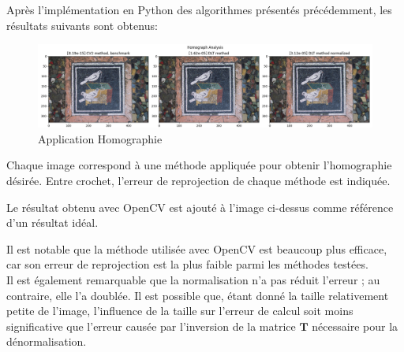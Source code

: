 \documentclass[../CSC_5RO17_TA_TP1.tex]{subfiles}
\begin{document}
\noindent Après l'implémentation en Python des algorithmes présentés précédemment, les résultats suivants sont obtenus:
\begin{figure}[H]
    \centering
    \includegraphics[width=\linewidth]{../../data/output/CSC_5RO17_TP1_Q3.png}
    \caption{Application Homographie}
    \label{fig_homography}
\end{figure}
Chaque image correspond à une méthode appliquée pour obtenir l'homographie désirée. Entre crochet, l'erreur de reprojection de chaque méthode est indiquée.
\begin{remark}
    Le résultat obtenu avec OpenCV est ajouté à l'image ci-dessus comme référence d'un résultat idéal.
    \begin{scriptsize}\mycode
        
    \end{scriptsize}
\end{remark}
\noindent Il est notable que la méthode utilisée avec OpenCV est beaucoup plus efficace, car son erreur de reprojection est la plus faible parmi les méthodes testées.\\

\noindent Il est également remarquable que la normalisation n'a pas réduit l'erreur ; au contraire, elle l'a doublée. Il est possible que, étant donné la taille relativement petite de l'image, l'influence de la taille sur l'erreur de calcul soit moins significative que l'erreur causée par l'inversion de la matrice $\textbf{T}$ nécessaire pour la dénormalisation.
\end{document}

